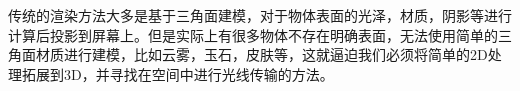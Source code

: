 传统的渲染方法大多是基于三角面建模，对于物体表面的光泽，材质，阴影等进行计算后投影到屏幕上。但是实际上有很多物体不存在明确表面，无法使用简单的三角面材质进行建模，比如云雾，玉石，皮肤等，这就逼迫我们必须将简单的2D处理拓展到3D，并寻找在空间中进行光线传输的方法。


